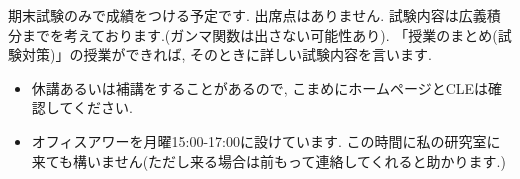 \documentclass[dvipdfmx,a4paper,11pt]{article}
\theoremstyle{definition}
\begin{document}
\hspace{-18pt}{\large 成績に関して}

期末試験のみで成績をつける予定です.  出席点はありません. 試験内容は広義積分までを考えております.(ガンマ関数は出さない可能性あり). 「授業のまとめ(試験対策)」の授業ができれば, そのときに詳しい試験内容を言います. 

\vspace{11pt}
\hspace{-18pt}{\large その他}
\begin{itemize}
  \setlength{\parskip}{0cm} %
  \setlength{\itemsep}{0cm} %
  \item 休講あるいは補講をすることがあるので, こまめにホームページとCLEは確認してください.
    \item オフィスアワーを月曜15:00-17:00に設けています. この時間に私の研究室に来ても構いません(ただし来る場合は前もって連絡してくれると助かります.)
 \end{itemize}



 
\end{document}
